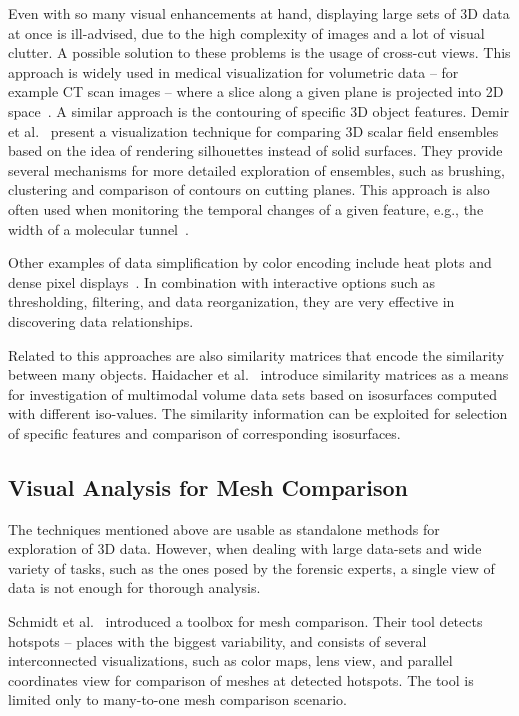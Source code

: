 \documentclass[final,5p,times]{elsarticle}
\begin{document}
Even with so many visual enhancements at hand, displaying large sets of 3D data at once is ill-advised, due to the high complexity of images and a lot of visual clutter. 
A possible solution to these problems is the usage of cross-cut views. 
This approach is widely used in medical visualization for volumetric data -- for example CT scan images -- where a slice along a given plane is projected into 2D space~\cite{friese2011yadiv}. 
A similar approach is the contouring of specific 3D object features.
Demir et al.~\cite{demir2016screen} present a visualization technique for
comparing 3D scalar field ensembles based on the idea of rendering silhouettes instead of solid surfaces.
They provide several mechanisms for more detailed exploration of ensembles, such as brushing, clustering and comparison of contours on cutting planes.
This approach is also often used when monitoring the temporal changes of a given feature, e.g., the width of a molecular tunnel~\cite{byska}.

Other examples of data simplification by color encoding include heat plots and dense pixel displays~\cite{byska,ivanisiev,zhai}. 
In combination with interactive options such as thresholding, filtering, and data reorganization, they are very effective in discovering data relationships.

Related to this approaches are also similarity matrices that encode the similarity between many objects. Haidacher et al.~\cite{haidacher2011volume} introduce similarity matrices as a means for investigation of multimodal volume data sets based on isosurfaces computed with different iso-values. The similarity information can be exploited for selection of specific features and comparison of corresponding isosurfaces.

\subsection{Visual Analysis for Mesh Comparison}
The techniques mentioned above are usable as standalone methods for exploration of 3D data.
However, when dealing with large data-sets and wide variety of tasks, such as the ones posed by the forensic experts, a single view of data is not enough for thorough analysis.

Schmidt et al.~\cite{ymca} introduced a toolbox for mesh comparison.
Their tool detects hotspots -- places with the biggest variability, and consists of several interconnected visualizations, such as color maps, lens view, and parallel coordinates view for comparison of meshes at detected hotspots.
The tool is limited only to many-to-one mesh comparison scenario.
\end{document}
